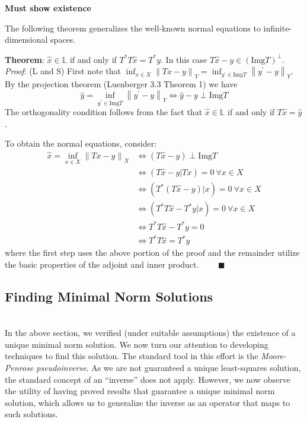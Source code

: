 \documentclass[12pt]{article}
\newcommand*{\norm}[1]{\left\lVert#1\right\rVert}
\newcommand{\Img}{\mathrm{Img}}
\begin{document}
 \smallskip 
 
\textbf{Must show existence} 

\medskip

The following theorem generalizes the well-known normal equations to infinite-dimensional spaces. 

\textbf{Theorem}: $\hat{x} \in \mathbb{L}$ if and only if $T^* T\hat{x} = T^* y$. In this case $T\hat{x} - y \in (\Img T)^\perp$. \\[.1cm] 

\textit{Proof}: (L and S) First note that $\inf_{x \in X} \norm{Tx - y}_Y = \inf_{y^\prime \in \Img T} \norm{y^\prime - y}_Y$. By the projection theorem (Luenberger 3.3 Theorem 1) we have \[\hat{y} = \inf_{y^\prime \in \Img T} \norm{y^\prime - y}_Y \iff \hat{y} - y \perp \Img T\] 
The orthogonality condition follows from the fact that $\hat{x} \in \mathbb{L}$ if and only if $T\hat{x} = \hat{y}$. 

\smallskip

To obtain the normal equations, consider: 
\begin{align*} 
\hat{x} = \inf_{x \in X} \norm{Tx - y}_X &\iff (T\hat{x} - y) \perp \Img T \\
                                                            &\iff (T\hat{x} - y| Tx) = 0 \ \forall x \in X \\
                                                            &\iff (T^*(T\hat{x} - y)| x) = 0 \ \forall x \in X \\
                                                            &\iff (T^*T\hat{x} - T^*y| x) = 0 \ \forall x \in X \\
                                                            &\iff T^*T\hat{x} - T^*y = 0 \\
                                                            &\iff T^*T\hat{x} = T^*y                                                            
\end{align*} 
where the first step uses the above portion of the proof and the remainder utilize the basic properties of the adjoint and inner product. $\qquad \blacksquare$
 
 \subsection{Finding Minimal Norm Solutions} \hfill \\
 
 In the above section, we verified (under suitable assumptions) the existence of a unique minimal norm solution. We now turn our attention to developing techniques to find this solution. The standard tool in this effort is the \textit{Moore-Penrose pseudoinverse}. As we are not guaranteed a unique least-squares solution, the standard concept of an ``inverse'' does not apply. However, we now observe the utility of having proved results that guarantee a unique minimal norm solution, which allows us to generalize the inverse as an operator that maps to such solutions. 
 
\end{document}
